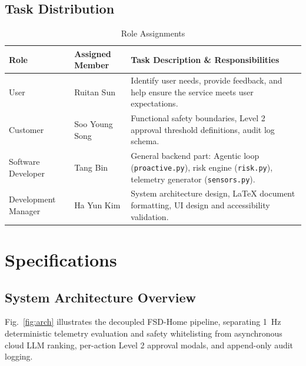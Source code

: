 \documentclass[conference]{IEEEtran}
\begin{document}
\subsection{Task Distribution}
\begin{table}[!t]
\caption{Role Assignments}
\begin{center}
\footnotesize
\begin{tabular}{@{}L{1.75cm}L{1.65cm}L{4.3cm}@{}}
\toprule
\textbf{Role} & \textbf{Assigned Member} & \textbf{Task Description \& Responsibilities} \\
\midrule
User & Ruitan Sun & Identify user needs, provide feedback, and help ensure the service meets user expectations. \\
Customer & Soo Young Song & Functional safety boundaries, Level 2 approval threshold definitions, audit log schema. \\
Software Developer & Tang Bin & General backend part: Agentic loop (\texttt{proactive.py}), risk engine (\texttt{risk.py}), telemetry generator (\texttt{sensors.py}). \\
Development Manager & Ha Yun Kim & System architecture design, LaTeX document formatting, UI design and accessibility validation. \\
\bottomrule
\end{tabular}
\end{center}
\end{table}

\section{Specifications}

\subsection{System Architecture Overview}
Fig.~\ref{fig:arch} illustrates the decoupled FSD-Home pipeline, separating 1~Hz deterministic telemetry evaluation and safety whitelisting from asynchronous cloud LLM ranking, per-action Level 2 approval modals, and append-only audit logging.
\end{document}
